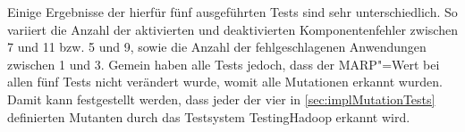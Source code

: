Einige Ergebnisse der hierfür fünf ausgeführten Tests sind sehr unterschiedlich.
So variiert die Anzahl der aktivierten und deaktivierten Komponentenfehler zwischen 7 und 11 bzw. 5 und 9, sowie die Anzahl der fehlgeschlagenen Anwendungen zwischen 1 und 3.
Gemein haben alle Tests jedoch, dass der \gls{MARP}"=Wert bei allen fünf Tests nicht verändert wurde, womit alle Mutationen erkannt wurden.
Damit kann festgestellt werden, dass jeder der vier in \cref{sec:implMutationTests} definierten Mutanten durch das Testsystem TestingHadoop erkannt wird.
